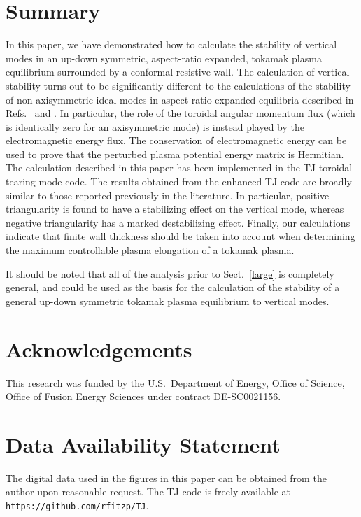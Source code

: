 \documentclass[12pt,prb,aps]{revtex4-1}
\begin{document}
\section{Summary}\label{summary}
In this paper,  we have demonstrated how to calculate the stability of vertical modes in an up-down symmetric, aspect-ratio expanded, tokamak plasma equilibrium surrounded by
a conformal resistive wall. The calculation of vertical stability turns out to be significantly different to the calculations of the stability
of non-axisymmetric ideal modes in aspect-ratio expanded equilibria described in Refs.~ and . In particular, the role of the toroidal angular momentum flux (which is
identically zero for an axisymmetric mode) is instead played by the electromagnetic energy flux. The conservation of electromagnetic energy can be
used to prove that the perturbed plasma potential energy matrix is Hermitian. 
The calculation described in this paper has been implemented in the TJ toroidal tearing mode code. 
The results obtained from the enhanced TJ code are broadly similar to those reported previously in the literature.\cite{f2,guz} In particular, positive triangularity is
found to have a stabilizing effect on the vertical mode, whereas negative triangularity has a marked destabilizing effect. Finally, our calculations indicate that finite wall thickness should be taken into account when
determining the maximum controllable plasma elongation of a tokamak plasma. 

It should be noted that all of the analysis prior to Sect.~\ref{large} is completely general, and could be used as the basis for the calculation of the
stability of a general up-down symmetric tokamak plasma equilibrium to vertical modes. 

\section*{Acknowledgements}
This research was funded by the  U.S.\ Department of Energy, Office of Science, Office of Fusion Energy Sciences under contract DE-SC0021156.

\section*{Data Availability Statement}
The digital data used in the figures in this paper can be obtained from the author upon reasonable request. The TJ code is freely 
available at {\tt https://github.com/rfitzp/TJ}. 
\end{document}

